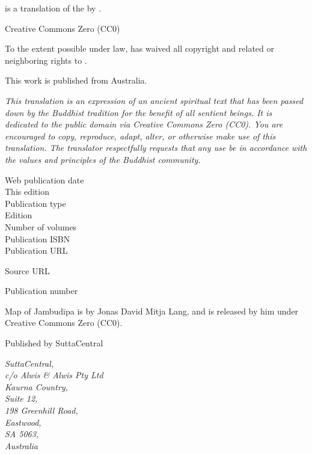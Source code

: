 
\begin{footnotesize}

\textit{} is a translation of the  by .

\medskip

Creative Commons Zero (CC0)

To the extent possible under law,  has waived all copyright and related or neighboring rights to \textit{}.

\medskip

This work is published from Australia.

\begin{center}
\textit{This translation is an expression of an ancient spiritual text that has been passed down by the Buddhist tradition for the benefit of all sentient beings. It is dedicated to the public domain via Creative Commons Zero (CC0). You are encouraged to copy, reproduce, adapt, alter, or otherwise make use of this translation. The translator respectfully requests that any use be in accordance with the values and principles of the Buddhist community.}
\end{center}

\medskip

\begin{description}
    \item[Web publication date] 
    \item[This edition] 
    \item[Publication type] 
    \item[Edition] 
    \item[Number of volumes] 
    \item[Publication ISBN] 
    \item[Publication URL] \href{\VAR{publication_url | safe}}{}
    \item[Source URL] \href{\VAR{source_url | safe}}{}
    \item[Publication number] 
\end{description}

\medskip

Map of Jambudīpa is by Jonas David Mitja Lang, and is released by him under Creative Commons Zero (CC0).

\medskip

Published by SuttaCentral

\medskip

\textit{SuttaCentral,\\
c/o Alwis \& Alwis Pty Ltd\\
Kaurna Country,\\
Suite 12,\\
198 Greenhill Road,\\
Eastwood,\\
SA 5063,\\
Australia}

\end{footnotesize}

\newpage

\setlength{\parindent}{1.5em}%
